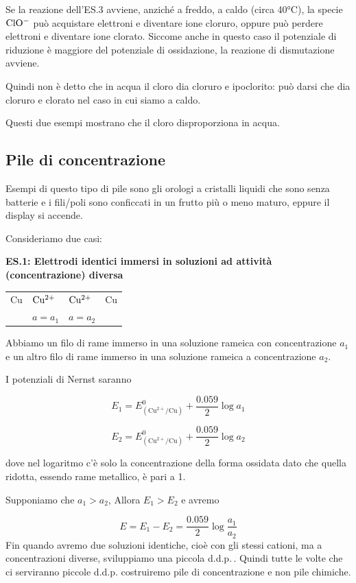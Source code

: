 Se la reazione dell'ES.3 avviene, anziché a freddo, a caldo (circa 40°C), la specie $\rm ClO^-$ può acquistare elettroni e diventare ione cloruro, oppure può perdere elettroni e diventare ione clorato. Siccome anche in questo caso il potenziale di riduzione è maggiore del potenziale di ossidazione, la reazione di dismutazione avviene.

Quindi non è detto che in acqua il cloro dia cloruro e ipoclorito: può darsi che dia cloruro e clorato nel caso in cui siamo a caldo.

\vspace{0.2cm}Questi due esempi mostrano che il cloro disproporziona in acqua.

\subsection{Pile di concentrazione}
Esempi di questo tipo di pile sono gli orologi a cristalli liquidi che sono senza batterie e i fili/poli sono conficcati in un frutto più o meno maturo, eppure il display si accende.

Consideriamo due casi:

\vspace{0.2cm}\textbf{ES.1: Elettrodi identici immersi in soluzioni ad attività (concentrazione) diversa}
\begin{center}
    \begin{tabular}{p{0.6cm}|p{1.6cm}||p{1.6cm}|p{2cm}}
        Cu & $\rm Cu^{2+}$ & $\rm Cu^{2+}$ & Cu\\[0.5ex]
         & $a= a_1$ & $a=a_2$&\\[0.5ex]
    \end{tabular}
\end{center}

Abbiamo un filo di rame immerso in una soluzione rameica con concentrazione $a_1$ e un altro filo di rame immerso in una soluzione rameica a concentrazione $a_2$.

I potenziali di Nernst saranno

$$E_1 = E^0_{(\text{Cu}^{2+}/\text{Cu})} + \frac{0.059}{2}\log a_1 $$

$$E_2 = E^0_{(\text{Cu}^{2+}/\text{Cu})} + \frac{0.059}{2}\log a_2 $$

dove nel logaritmo c'è solo la concentrazione della forma ossidata dato che quella ridotta, essendo rame metallico, è pari a 1.

Supponiamo che $a_1 > a_2$, Allora $E_1 > E_2$ e avremo 

$$E=E_1 - E_2 = \frac{0.059}{2} \log \frac{a_1}{a_2}$$
Fin quando avremo due soluzioni identiche, cioè con gli stessi cationi, ma a concentrazioni diverse, sviluppiamo una piccola d.d.p.\,. Quindi tutte le volte che ci serviranno piccole d.d.p. costruiremo pile di concentrazione e non pile chimiche.


